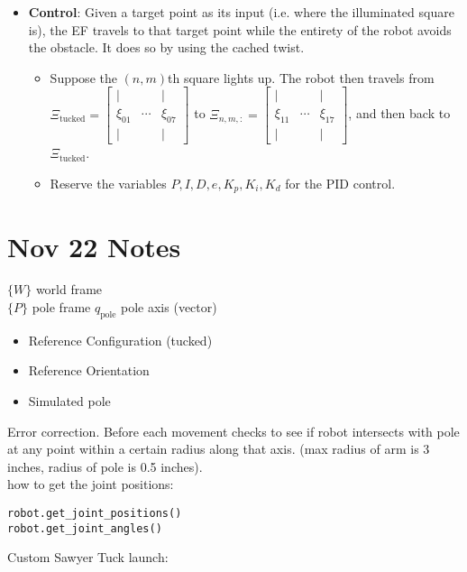 \documentclass{article}
\begin{document}
\begin{itemize}
    \item \textbf{Control}: Given a target point as its input (i.e. where the illuminated square is), the EF travels to that target point while the entirety of the robot avoids the obstacle. It does so by using the cached twist.
    \begin{itemize}
        \item Suppose the $(n, m)$th square lights up. The robot then travels from $\Xi_\text{tucked} = \begin{bmatrix}
            | & & |\\
            \xi_{01} & \cdots & \xi_{07}\\
            |&&|
        \end{bmatrix}$ to $\Xi_{n,m,:} = \begin{bmatrix}
            | & & |\\
            \xi_{11} & \cdots & \xi_{17}\\
            |&&|
        \end{bmatrix}$, and then back to $\Xi_\text{tucked}$.
        \item Reserve the variables $P, I, D, e, K_p, K_i, K_d$ for the PID control.
    \end{itemize}
\end{itemize}


\pagebreak
\section{Nov 22 Notes}
$\{W\}$ world frame\\
$\{P\}$ pole frame
$q_\text{pole}$ pole axis (vector)

\begin{itemize}
    \item Reference Configuration (tucked)
    \item Reference Orientation
    \item Simulated pole
\end{itemize}

Error correction. Before each movement checks to see if robot intersects with pole at any point within a certain radius along that axis. (max radius of arm is 3 inches, radius of pole is 0.5 inches).\\
how to get the joint positions: 
\begin{verbatim}
robot.get_joint_positions()
robot.get_joint_angles()
\end{verbatim}
Custom Sawyer Tuck launch: 
\end{document}
